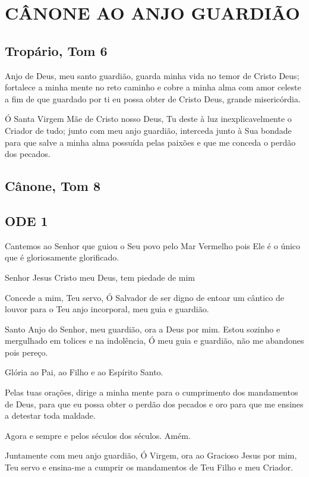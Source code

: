 \documentclass{subfiles}
\begin{document}
\chapter{CÂNONE AO ANJO GUARDIÃO}

\section{Tropário, Tom 6}

Anjo de Deus, meu santo guardião, guarda minha vida no temor de
Cristo Deus; fortalece a minha mente no reto caminho e cobre a minha alma
com amor celeste a fim de que guardado por ti eu possa obter de Cristo Deus,
grande misericórdia.

\theotokion{}Ó Santa Virgem Mãe de Cristo nosso Deus, Tu deste à luz
inexplicavelmente o Criador de tudo; junto com meu anjo guardião, interceda
junto à Sua bondade para que salve a minha alma possuída pelas paixões e que
me conceda o perdão dos pecados.

\section{Cânone, Tom 8}

\section{ODE 1}

\eirmos{}Cantemos ao Senhor que guiou o Seu povo pelo Mar Vermelho pois Ele
é o único que é gloriosamente glorificado.

Senhor Jesus Cristo meu Deus, tem piedade de mim

\textbf{}Concede a mim, Teu servo, Ó Salvador de ser
digno de entoar um cântico de louvor para o Teu anjo incorporal, meu guia e
guardião.

Santo Anjo do Senhor, meu guardião, ora a Deus por mim.
Estou sozinho e mergulhado em tolices e na indolência, Ó meu guia e
guardião, não me abandones pois pereço.

Glória ao Pai, ao Filho e ao Espírito Santo.

Pelas tuas orações, dirige a minha mente para o cumprimento dos
mandamentos de Deus, para que eu possa obter o perdão dos pecados e oro
para que me ensines a detestar toda maldade.

Agora e sempre e pelos séculos dos séculos. Amém.

Juntamente com meu anjo guardião, Ó Virgem, ora ao Gracioso Jesus
por mim, Teu servo e ensina-me a cumprir os mandamentos de Teu Filho e
meu Criador.
\end{document}

